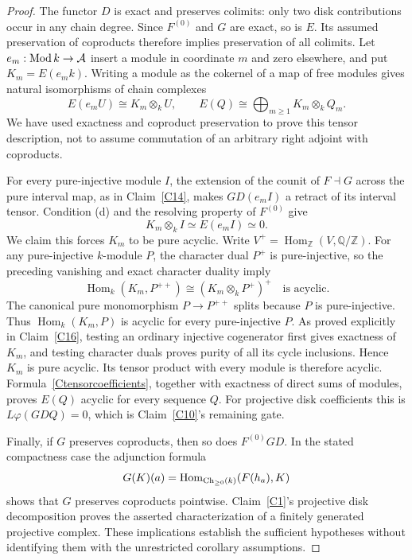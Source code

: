 \begin{proof}
The functor $D$ is exact and preserves colimits: only two disk contributions occur in any chain degree. Since $F^{(0)}$ and $G$ are exact, so is $E$. Its assumed preservation of coproducts therefore implies preservation of all colimits. Let $e_m:\operatorname{Mod} k\to\mathcal A$ insert a module in coordinate $m$ and zero elsewhere, and put $K_m=E(e_m k)$. Writing a module as the cokernel of a map of free modules gives natural isomorphisms of chain complexes
\[
 E(e_mU)\cong K_m\otimes_kU,
 \qquad E(Q)\cong\bigoplus_{m\geq1}K_m\otimes_kQ_m.
 \tag{C-tensor-coefficients}\label{Ctensorcoefficients}
\]
We have used exactness and coproduct preservation to prove this tensor description, not to assume commutation of an arbitrary right adjoint with coproducts.

For every pure-injective module $I$, the extension of the counit of $F\dashv G$ across the pure interval map, as in Claim~\ref{C14}, makes $GD(e_mI)$ a retract of its interval tensor. Condition (d) and the resolving property of $F^{(0)}$ give
\[
 K_m\otimes_k I\simeq E(e_mI)\simeq0.
\]
We claim this forces $K_m$ to be pure acyclic. Write $V^+=\operatorname{Hom}_{\mathbb Z}(V,\mathbb Q/\mathbb Z)$. For any pure-injective $k$-module $P$, the character dual $P^+$ is pure-injective, so the preceding vanishing and exact character duality imply
\[
 \operatorname{Hom}_k(K_m,P^{++})
 \cong (K_m\otimes_kP^+)^+
 \quad\text{is acyclic}.
\]
The canonical pure monomorphism $P\to P^{++}$ splits because $P$ is pure-injective. Thus $\operatorname{Hom}_k(K_m,P)$ is acyclic for every pure-injective $P$. As proved explicitly in Claim~\ref{C16}, testing an ordinary injective cogenerator first gives exactness of $K_m$, and testing character duals proves purity of all its cycle inclusions. Hence $K_m$ is pure acyclic. Its tensor product with every module is therefore acyclic. Formula~\eqref{Ctensorcoefficients}, together with exactness of direct sums of modules, proves $E(Q)$ acyclic for every sequence $Q$. For projective disk coefficients this is $L\varphi(GDQ)=0$, which is Claim~\ref{C10}'s remaining gate.

Finally, if $G$ preserves coproducts, then so does $F^{(0)}GD$. In the stated compactness case the adjunction formula
\[
 G(K)(a)=\operatorname{Hom}_{\operatorname{Ch}_{\geq0}(k)}(F(h_a),K)
\]
shows that $G$ preserves coproducts pointwise. Claim~\ref{C1}'s projective disk decomposition proves the asserted characterization of a finitely generated projective complex. These implications establish the sufficient hypotheses without identifying them with the unrestricted corollary assumptions.
\end{proof}


